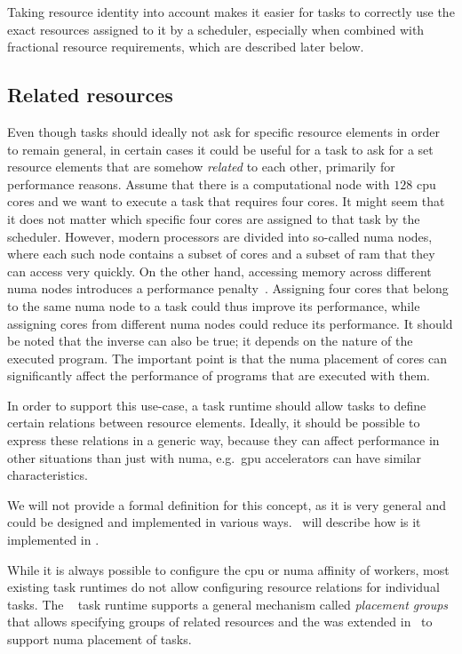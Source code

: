 Taking resource identity into account makes it easier for tasks to correctly use the exact
resources assigned to it by a scheduler, especially when combined with fractional resource
requirements, which are described later below.

\subsection{Related resources}
Even though tasks should ideally not ask for specific resource elements in order to remain
general, in certain cases it could be useful for a task to ask for a set resource elements that are
somehow \emph{related} to each other, primarily for performance reasons. Assume that there
is a computational node with $128$ \gls{cpu} cores and we want to
execute a task that requires four cores. It might seem that it does not matter which specific four
cores are assigned to that task by the scheduler. However, modern processors are divided into
so-called \gls{numa} nodes, where each such node contains a subset of cores and a
subset of \gls{ram} that they can access very quickly. On the other hand, accessing
memory across different \gls{numa} nodes introduces a performance
penalty~\cite{numa_effect}. Assigning four cores that belong to the same
\gls{numa} node to a task could thus improve its performance, while assigning cores
from different \gls{numa} nodes could reduce its performance. It should be noted that
the inverse can also be true; it depends on the nature of the executed program. The important point
is that the \gls{numa} placement of cores can significantly affect the performance of
programs that are executed with them.

In order to support this use-case, a task runtime should allow tasks to define certain relations
between resource elements. Ideally, it should be possible to express these relations in a generic
way, because they can affect performance in other situations than just with
\gls{numa}, e.g.\ \gls{gpu} accelerators can have similar
characteristics.

We will not provide a formal definition for this concept, as it is very general and could be
designed and implemented in various ways.~ will describe how is it
implemented in \hyperqueue{}.

While it is always possible to configure the \gls{cpu} or \gls{numa}
affinity of workers, most existing task runtimes do not allow configuring resource relations for
individual tasks. The \ray{}~\cite{ray} task runtime supports a
general mechanism called \emph{placement groups} that allows specifying groups of related resources
and the \pycompss{} was extended in~\cite{pycompss_numa} to support
\gls{numa} placement of tasks.

